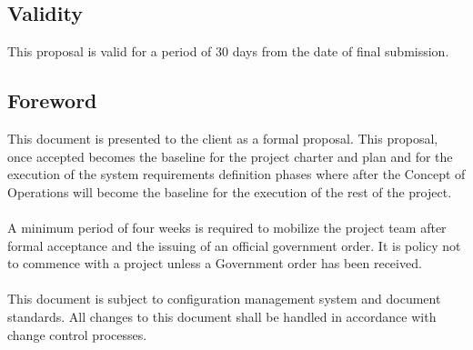 \subsection{Validity}
This proposal is valid for a period of 30 days from the date of final submission.
\subsection{Foreword}
This document is presented to the client \client as a formal proposal.  This proposal, once accepted becomes the baseline for the \project project charter and plan and for the execution of the system requirements definition phases where after the Concept of Operations will become the baseline for the execution of the rest of the project. \\
\\
A minimum period of four weeks is required to mobilize the project team after formal acceptance and the issuing of an official government order.  It is \vendor policy not to commence with a project unless a Government order has been received. \\
\\
This document is subject to \vendors configuration management system and document standards.  All changes to this document shall be handled in accordance with \vendors change control processes.
